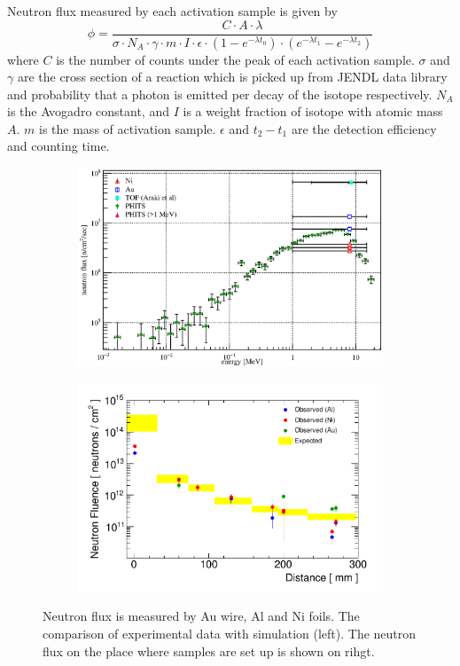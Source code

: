Neutron flux measured by each activation sample is given by~\cite{nicholas}
\begin{equation}
 \phi = \frac{C \cdot A \cdot \lambda}{\sigma \cdot N_A \cdot \gamma \cdot m \cdot I \cdot \epsilon \cdot (1 - e^{-\lambda t_0}) \cdot (e^{-\lambda t_1} - e^{-\lambda t_2})}
\end{equation}
where $C$ is the number of counts under the peak of each activation sample.
$\sigma$ and $\gamma$ are the cross section of a reaction which is picked up from JENDL data library and probability that a photon is emitted per decay of the isotope respectively.
$N_A$ is the Avogadro constant, and $I$ is a weight fraction of isotope with atomic mass $A$.
$m$ is the mass of activation sample.
$\epsilon$ and $t_2-t_1$ are the detection efficiency and counting time.
  \begin{figure}[H]
   \begin{subfigure}{0.3\textwidth}
   \centering
   \includegraphics[scale=0.45]{chapter4/fig/flux}
   \end{subfigure}
   \hspace{0.2\textwidth}
   \begin{subfigure}{0.3\textwidth}
   \centering
   \includegraphics[scale=0.48]{chapter4/fig/fluxtot.pdf}
   \end{subfigure}
   \caption{Neutron flux is measured by Au wire, Al and Ni foils. The comparison of experimental data with simulation (left). The neutron flux on the place where samples are set up is shown on rihgt.}
   \label{3flux}
  \end{figure}

